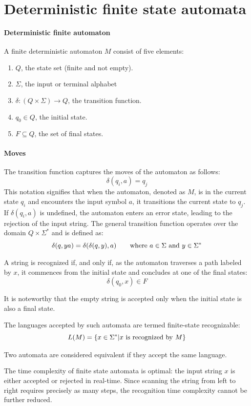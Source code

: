 \section{Deterministic finite state automata}

\paragraph*{Deterministic finite automaton}
A finite deterministic automaton $M$ consist of five elements:
\begin{enumerate}
    \item $Q$, the state set (finite and not empty). 
    \item $\Sigma$, the input or terminal alphabet
    \item $\delta:(Q \times \Sigma) \rightarrow Q$, the transition function.
    \item $q_0 \in Q$, the initial state. 
    \item $F\subseteq Q$, the set of final states.
\end{enumerate}

\paragraph*{Moves}
The transition function captures the moves of the automaton as follows:
\[\delta(q_i,a)=q_j\]
This notation signifies that when the automaton, denoted as $M$, is in the current state $q_i$ and encounters the input symbol $a$, it transitions the current state to $q_j$. 
If $\delta(q_i, a)$ is undefined, the automaton enters an error state, leading to the rejection of the input string.
The general transition function operates over the domain $Q \times \Sigma^{\ast}$ and is defined as:
\[\delta(q,ya)=\delta(\delta(q,y),a) \qquad \textnormal{where } a \in \Sigma \textnormal{ and }y \in \Sigma^{\ast}\]
\begin{definition}
    A string is recognized if, and only if, as the automaton traverses a path labeled by $x$, it commences from the initial state and concludes at one of the final states:
    \[\delta(q_0,x) \in F\]
\end{definition}
It is noteworthy that the empty string is accepted only when the initial state is also a final state.
\begin{definition}
    The languages accepted by such automata are termed finite-state recognizable:
    \[L(M)=\{x \in \Sigma^{\ast}|x \textnormal{ is recognized by } M\}\]
\end{definition}
\begin{definition}
    Two automata are considered equivalent if they accept the same language.
\end{definition}
The time complexity of finite state automata is optimal: the input string $x$ is either accepted or rejected in real-time. 
Since scanning the string from left to right requires precisely as many steps, the recognition time complexity cannot be further reduced.


